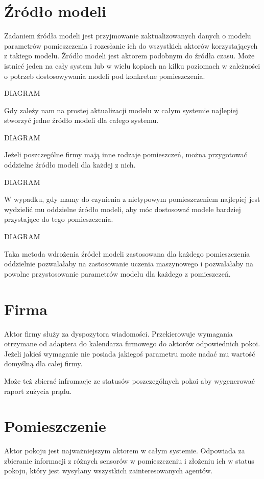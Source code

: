 \section{Źródło modeli}
Zadaniem źródła modeli jest przyjmowanie zaktualizowanych danych o modelu parametrów pomieszczenia i rozesłanie ich do wszystkich aktorów korzystających z takiego modelu.
Źródło modeli jest aktorem podobnym do źródła czasu. 
Może istnieć jeden na cały system lub w wielu kopiach na kilku poziomach w zależności o potrzeb dostosowywania modeli pod konkretne pomieszczenia.

DIAGRAM
% 

Gdy zależy nam na prostej aktualizacji modelu w całym systemie najlepiej stworzyć jedne źródło modeli dla całego systemu.

DIAGRAM

Jeżeli poszczególne firmy mają inne rodzaje pomieszczeń, można przygotować oddzielne źródło modeli dla każdej z nich.

DIAGRAM

W wypadku, gdy mamy do czynienia z nietypowym pomieszczeniem najlepiej jest wydzielić mu oddzielne źródło modeli, aby móc dostosować modele bardziej przystające do tego pomieszczenia.

DIAGRAM

Taka metoda wdrożenia źródeł modeli zastosowana dla każdego pomieszczenia oddzielnie pozwalałaby na zastosowanie uczenia maszynowego i pozwalałaby na powolne przystosowanie parametrów modelu dla każdego z pomieszczeń.

\section{Firma}
Aktor firmy służy za dyspozytora wiadomości. Przekierowuje wymagania otrzymane od adaptera do kalendarza firmowego do aktorów odpowiednich pokoi.
Jeżeli jakieś wymaganie nie posiada jakiegoś parametru może nadać mu wartość domyślną dla całej firmy.

Może też zbierać infromacje ze statusów poszczególnych pokoi aby wygenerować raport zużycia prądu.

\section{Pomieszczenie}
Aktor pokoju jest najważniejszym aktorem w całym systemie. 
Odpowiada za zbieranie informacji z różnych sensorów w pomieszczeniu i złożeniu ich w status pokoju, który jest wysyłany wszystkich zainteresowanych agentów.

